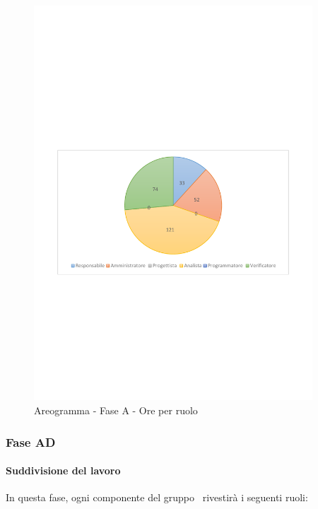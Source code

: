\documentclass[../PianoProgetto.tex]{subfiles}
\begin{document}
	\begin{figure}[!h]
		\centering
		\includegraphics[width=0.93\textwidth , trim=2cm 9.5cm 2cm 11cm]{grafici/A/A-ore-ruolo}
			\caption{Areogramma - Fase A - Ore per ruolo}
		\label{fig:CircleChart-faseA_ore_r}
	\end{figure}
\vfill	
	
	\subsubsection{Fase AD}
				\paragraph{Suddivisione del lavoro}
					In questa fase, ogni componente del gruppo \leaf\ rivestirà i seguenti ruoli:
	
\end{document}
